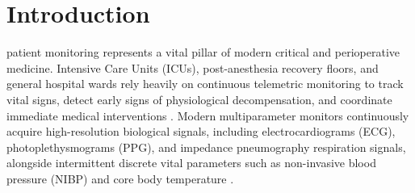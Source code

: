 \documentclass[10pt,journal,compsoc]{IEEEtran}
\begin{document}
\maketitle
\IEEEdisplaynontitleabstractindextext
\IEEEpeerreviewmaketitle

\section{Introduction}
 patient monitoring represents a vital pillar of modern critical and perioperative medicine. Intensive Care Units (ICUs), post-anesthesia recovery floors, and general hospital wards rely heavily on continuous telemetric monitoring to track vital signs, detect early signs of physiological decompensation, and coordinate immediate medical interventions \cite{goldberger2000physiobank,yang2024icu}. Modern multiparameter monitors continuously acquire high-resolution biological signals, including electrocardiograms (ECG), photoplethysmograms (PPG), and impedance pneumography respiration signals, alongside intermittent discrete vital parameters such as non-invasive blood pressure (NIBP) and core body temperature \cite{pimentel2016robust,lee2022vitaldb}.
\end{document}
